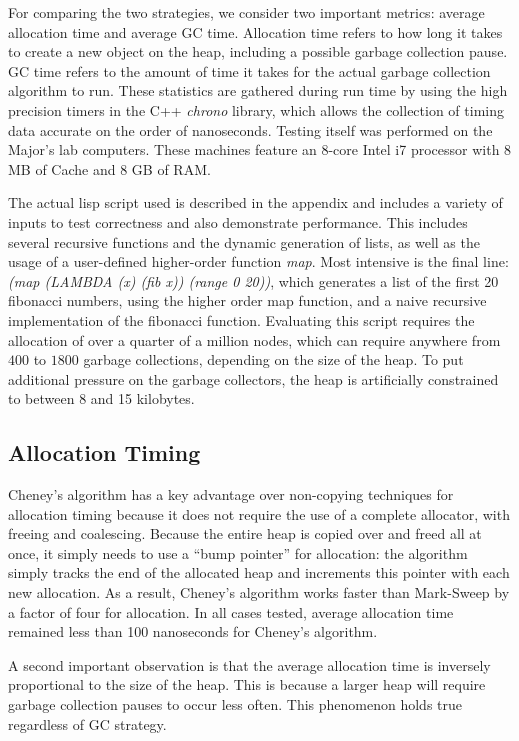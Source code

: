 \documentclass[11pt,leqno]{article}
\begin{document}
For comparing the two strategies, we consider two important metrics: average allocation time and average GC time. Allocation time refers to how long it takes to create a new object on the heap, including a possible garbage collection pause. GC time refers to the amount of time it takes for the actual garbage collection algorithm to run. These statistics are gathered during run time by using the high precision timers in the C++ \emph{chrono} library, which allows the collection of timing data accurate on the order of nanoseconds. Testing itself was performed on the Major's lab computers. These machines feature an 8-core Intel i7 processor with 8 MB of Cache and 8 GB of RAM.

The actual lisp script used is described in the appendix and includes a variety of inputs to test correctness and also demonstrate performance. This includes several recursive functions and the dynamic generation of lists, as well as the usage of a user-defined higher-order function \emph{map}. Most intensive is the final line: \emph{(map (LAMBDA (x) (fib x)) (range 0 20))}, which generates a list of the first 20 fibonacci numbers, using the higher order map function, and a naive recursive implementation of the fibonacci function. Evaluating this script requires the allocation of over a quarter of a million nodes, which can require anywhere from $400$ to $1800$ garbage collections, depending on the size of the heap. To put additional pressure on the garbage collectors, the heap is artificially constrained to between 8 and 15 kilobytes.

\subsection{Allocation Timing}

Cheney's algorithm has a key advantage over non-copying techniques for allocation timing because it does not require the use of a complete allocator, with freeing and coalescing. Because the entire heap is copied over and freed all at once, it simply needs to use a ``bump pointer'' for allocation: the algorithm simply tracks the end of the allocated heap and increments this pointer with each new allocation. As a result, Cheney's algorithm works faster than Mark-Sweep by a factor of four for allocation. In all cases tested, average allocation time remained less than 100 nanoseconds for Cheney's algorithm. 

A second important observation is that the average allocation time is inversely proportional to the size of the heap. This is because a larger heap will require garbage collection pauses to occur less often. This phenomenon holds true regardless of GC strategy.
\end{document}
